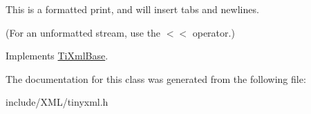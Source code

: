 This is a formatted print, and will insert tabs and newlines.

(For an unformatted stream, use the $<$$<$ operator.) 

Implements \hyperlink{class_ti_xml_base_a0de56b3f2ef14c65091a3b916437b512}{TiXmlBase}.

The documentation for this class was generated from the following file:\begin{DoxyCompactItemize}
\item 
include/XML/tinyxml.h\end{DoxyCompactItemize}
